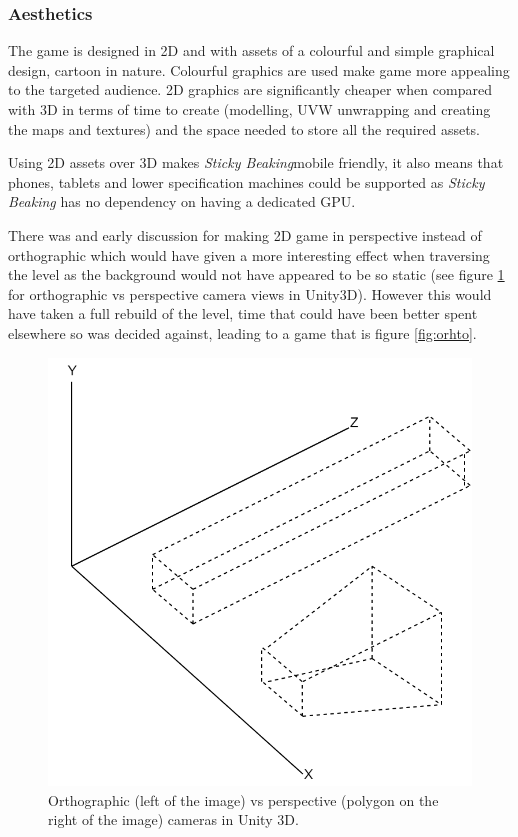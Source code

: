 \documentclass[12pt]{article}
\newcommand{\game}[2]{\textit{#1}}{}
\begin{document}
\subsubsection{Aesthetics}
The game is designed in 2D and with assets of a colourful and simple graphical design, cartoon in nature. Colourful graphics are used make game more appealing to the targeted audience. 2D graphics are significantly cheaper when compared with 3D in terms of time to create (modelling, UVW unwrapping and creating the maps and textures) and the space needed to store all the required assets. 

Using 2D assets over 3D makes \game{Sticky Beaking}{ }mobile friendly, it also means that phones, tablets and lower specification machines could be supported as \game{Sticky Beaking}{ } has no dependency on having a dedicated GPU.

There was and early discussion for making 2D game in perspective instead of orthographic which would have given a more interesting effect when traversing the level as the background would not have appeared to be so static (see figure \ref{fig:orhtovspers} for orthographic vs perspective camera views in Unity3D). However this would have taken a full rebuild of the level, time that could have been better spent elsewhere so was decided against, leading to a game that is figure \ref{fig:orhto}.

\begin{figure}[H]
    \centering
    \includegraphics[scale=0.2]{orthovsperps.png}
    \caption{Orthographic (left of the image) vs perspective (polygon on the right of the image) cameras in Unity 3D.}
    \label{fig:orhtovspers}
\end{figure}
\end{document}
